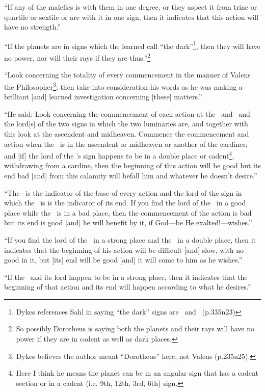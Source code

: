 ``If  any of the malefics is with them in one degree, or they aspect it from trine or quartile or sextile or are with it in one sign, then it indicates that this action will have no strength.''

``If  the planets are in signs which the learned call ``the dark''\footnote{Dykes references Sahl in saying ``the dark'' signs are \Libra\, and \Capricorn\, (p.335n23)}, then they will have no power, nor will their rays if they are thus.''\footnote{So possibly Dorotheus is saying both the planets and their rays will have no power if they are in cadent as well as dark places.} 

``Look  concerning the totality of every commencement in the manner of Valens the Philosopher\footnote{Dykes believes the author meant ``Dorotheus'' here, not Valens (p.235n25).}; then take into consideration his words as he was making a brilliant [and] learned investigation concerning [these] matters.''

``He  said: Look concerning the commencement of each action at the \Sun\, and \Moon\, and the lord[s] of the two signs in which the two luminaries are, and together with this look at the ascendent and midheaven. Commence the commencement and action when the \Moon\, is in the ascendent or midheaven or another of the cardines; and [if] the lord of the \Moon's sign happens to be in a double place or cadent\footnote{Here I think he means the planet can be in an angular sign that has a cadent section or in a cadent (i.e. 9th, 12th, 3rd, 6th) sign.}, withdrawing from a cardine, then the beginning of this action will be good but its end bad [and] from this calamity will befall him and whatever he doesn't desire.''

``The \Moon\, is the indicator of the base of every action and the lord of the sign in which the \Moon\, is is the indicator of its end. If you find the lord of the \Moon\, in a good place while the \Moon\, is in a bad place, then the commencement of the action is bad but its end is good [and] he will benefit by it, if God---be He exalted!---wishes.''

``If  you find the lord of the \Moon\, in a strong place and the \Moon\, in a double place, then it indicates that the beginning of his action will be difficult [and] slow, with no good in it, but [its] end will be good [and] it will come to him as he wishes.''

``If  the \Moon\, and its lord happen to be in a strong place, then it indicates that the beginning of that action and its end will happen according to what he desires.''

